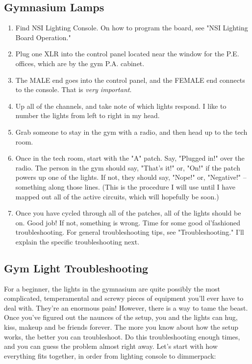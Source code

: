 \documentclass[letterpaper,10pt,oneside,headsepline]{scrreprt}
\begin{document}
\subsection{Gymnasium Lamps}
\begin{enumerate}
\item Find NSI Lighting Console. On how to program the board, see "NSI Lighting Board Operation."
\item Plug one XLR into the control panel located near the window for the P.E. offices, which are by the gym P.A. cabinet.
\item The MALE end goes into the control panel, and the FEMALE end connects to the console. That is \textit{very important}.
\item Up all of the channels, and take note of which lights respond. I like to number the lights from left to right in my head.
\item Grab someone to stay in the gym with a radio, and then head up to the tech room.
\item Once in the tech room, start with the "A" patch. Say, "Plugged in!" over the radio. The person in the gym should say, "That's it!" or, "On!" if the patch powers up one of the lights. If not, they should say, "Nope!" or, "Negative!" -- something along those lines. (This is the procedure I will use until I have mapped out all of the active circuits, which will hopefully be soon.)
\item Once you have cycled through all of the patches, all of the lights should be on. Good job! If not, something is wrong. Time for some good ol'fashioned troubleshooting. For general troubleshooting tips, see "Troubleshooting." I'll explain the specific troubleshooting next.
\end{enumerate}
\subsection{Gym Light Troubleshooting}
For a beginner, the lights in the gymnasium are quite possibly the most complicated, temperamental and screwy pieces of equipment you'll ever have to deal with. They're an enormous pain! However, there is a way to tame the beast. Once you've figured out the naunces of the setup, you and the lights can hug, kiss, makeup and be friends forever. The more you know about how the setup works, the better you can troubleshoot. Do this troubleshooting enough times, and you can guess the problem almost right away. Let's start with how everything fits together, in order from lighting console to dimmerpack:
\end{document}
